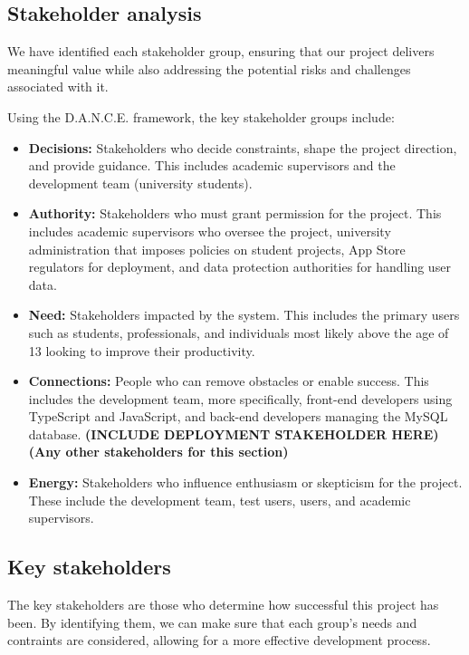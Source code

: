 \subsection{Stakeholder analysis}
We have identified each stakeholder group, ensuring that our project delivers meaningful value while also addressing the potential risks and challenges associated with it.

Using the D.A.N.C.E. framework, the key stakeholder groups include:
\begin{itemize}
    \item \textbf{Decisions:} Stakeholders who decide constraints, shape the project direction, and provide guidance. This includes academic supervisors and the development team (university students).

    \item \textbf{Authority:} Stakeholders who must grant permission for the project. This includes academic supervisors who oversee the project, university administration that imposes policies on student projects, App Store regulators for deployment, and data protection authorities for handling user data.

    \item \textbf{Need:} Stakeholders impacted by the system. This includes the primary users such as students, professionals, and individuals most likely above the age of 13 looking to improve their productivity.

    \item \textbf{Connections:} People who can remove obstacles or enable success. This includes the development team, more specifically, front-end developers using TypeScript and JavaScript, and back-end developers managing the MySQL database. \textbf{(INCLUDE DEPLOYMENT STAKEHOLDER HERE)} \textbf{(Any other stakeholders for this section)}

    \item \textbf{Energy:} Stakeholders who influence enthusiasm or skepticism for the project. These include the development team, test users, users, and academic supervisors.
\end{itemize}

\subsection{Key stakeholders}
The key stakeholders are those who determine how successful this project has been. By identifying them, we can make sure that each group's needs and contraints are considered, allowing for a more effective development process.

